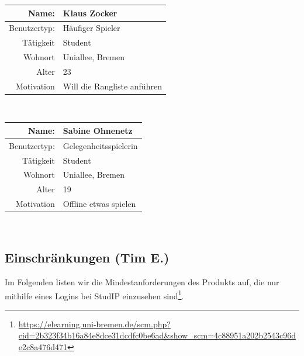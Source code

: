 \documentclass[fontsize=12pt,paper=a4,twoside]{scrartcl}
\begin{document}
    	\begin{tabular}{|r|l|}\hline
       Name: & Klaus Zocker\\\hline
       Benutzertyp: & Häufiger Spieler \\\hline
       Tätigkeit	& Student\\\hline
       Wohnort & Uniallee, Bremen\\\hline
       Alter	 & 23\\\hline
       Motivation & Will die Rangliste anführen\\\hline
    \end{tabular}\\
    
    \begin{tabular}{|r|l|}\hline
       Name: & Sabine Ohnenetz\\\hline
       Benutzertyp: & Gelegenheitsspielerin \\\hline
       Tätigkeit	& Student\\\hline
       Wohnort & Uniallee, Bremen\\\hline
       Alter	 & 19\\\hline
       Motivation & Offline etwas spielen \\\hline
    \end{tabular}\\
  
  \subsection{Einschränkungen (Tim E.)}

Im Folgenden listen wir die Mindestanforderungen des Produkts auf, die nur mithilfe eines Logins bei StudIP einzusehen sind\footnote{\url{https://elearning.uni-bremen.de/scm.php?cid=2b323f34b16a84e8dce31dcdfc0be6ad\&show\_scm=4c88951a202b2543c96de2c8a476d471}}.
\end{document}
